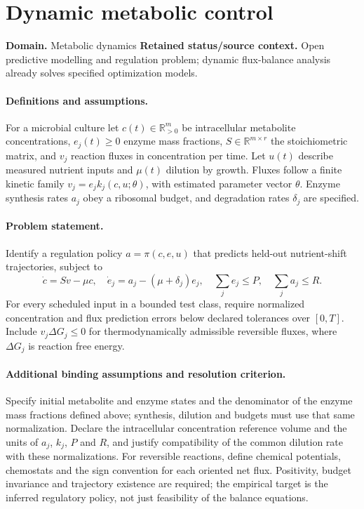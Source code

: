 \documentclass[11pt]{article}
\begin{document}
\section*{Dynamic metabolic control}
\label{prob:052}
\label{rank:125}
\par\smallskip

\noindent\textbf{Domain.} Metabolic dynamics \quad \textbf{Retained status/source context.} Open predictive modelling and regulation problem; dynamic flux-balance analysis already solves specified optimization models.
\paragraph{Definitions and assumptions.} For a microbial culture let $c(t)\in\mathbb{R}_{>0}^m$ be intracellular metabolite concentrations, $e_j(t)\ge0$ enzyme mass fractions, $S\in\mathbb{R}^{m\times r}$ the stoichiometric matrix, and $v_j$ reaction fluxes in concentration per time. Let $u(t)$ describe measured nutrient inputs and $\mu(t)$ dilution by growth. Fluxes follow a finite kinetic family $v_j=e_jk_j(c,u;\theta)$, with estimated parameter vector $\theta$. Enzyme synthesis rates $a_j$ obey a ribosomal budget, and degradation rates $\delta_j$ are specified.
\paragraph{Problem statement.} Identify a regulation policy $a=\pi(c,e,u)$ that predicts held-out nutrient-shift trajectories, subject to
\[\dot c=Sv-\mu c,\quad \dot e_j=a_j-(\mu+\delta_j)e_j,\quad \sum_j e_j\le P,\quad \sum_j a_j\le R.\]
For every scheduled input in a bounded test class, require normalized concentration and flux prediction errors below declared tolerances over $[0,T]$. Include $v_j\Delta G_j\le0$ for thermodynamically admissible reversible fluxes, where $\Delta G_j$ is reaction free energy.
\paragraph{Additional binding assumptions and resolution criterion.} Specify initial metabolite and enzyme states and the denominator of the enzyme mass fractions defined above; synthesis, dilution and budgets must use that same normalization. Declare the intracellular concentration reference volume and the units of $a_j$, $k_j$, $P$ and $R$, and justify compatibility of the common dilution rate with these normalizations. For reversible reactions, define chemical potentials, chemostats and the sign convention for each oriented net flux. Positivity, budget invariance and trajectory existence are required; the empirical target is the inferred regulatory policy, not just feasibility of the balance equations.
\end{document}
